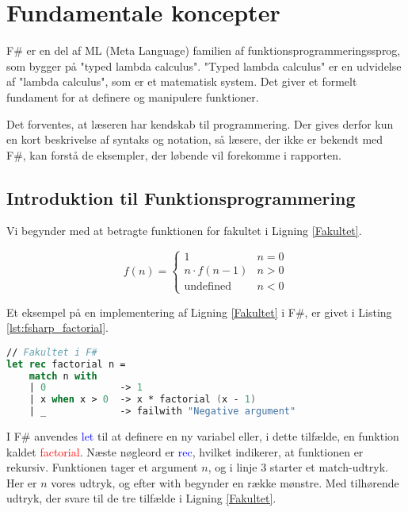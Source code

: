 
\section{Fundamentale koncepter}
F\# er en del af ML (Meta Language) familien af funktionsprogrammeringssprog, som bygger på "typed lambda calculus". "Typed lambda calculus" er en udvidelse af "lambda calculus", som er et matematisk system. Det giver et formelt fundament for at definere og manipulere funktioner.

Det forventes, at læseren har kendskab til programmering. Der gives derfor kun en kort beskrivelse af syntaks og notation, så læsere, der ikke er bekendt med F\#, kan forstå de eksempler, der løbende vil forekomme i rapporten. 

\subsection{Introduktion til Funktionsprogrammering}
Vi begynder med at betragte funktionen for fakultet i Ligning \eqref{Fakultet}.

\begin{equation}
    \label{Fakultet}
    f(n) = \begin{cases} 
            1 &  n = 0  \\
            n \cdot f(n-1) & n > 0 \\
            \text{undefined} & n < 0 
           \end{cases}
\end{equation}

Et eksempel på en implementering af Ligning \eqref{Fakultet} i F\#, er givet i Listing \ref{lst:fsharp_factorial}.

\begin{lstlisting}[language={FSharp}, label={lst:fsharp_factorial}, caption={Eksempel på Fakultet i F\#}]
// Fakultet i F#
let rec factorial n =
    match n with
    | 0             -> 1 
    | x when x > 0  -> x * factorial (x - 1)
    | _             -> failwith "Negative argument"
\end{lstlisting}

I F\# anvendes \textcolor{blue}{let} til at definere en ny variabel eller, i dette tilfælde, en funktion kaldet \textcolor{red}{factorial}. Næste nøgleord er \textcolor{blue}{rec}, hvilket indikerer, at funktionen er rekursiv. Funktionen tager et argument \(n\), og i linje 3 starter et match-udtryk. Her er \(n\) vores udtryk, og efter \textcolor{codepurple}{with} begynder en række mønstre. Med tilhørende udtryk, der svare til de tre tilfælde i Ligning \eqref{Fakultet}. 
    
